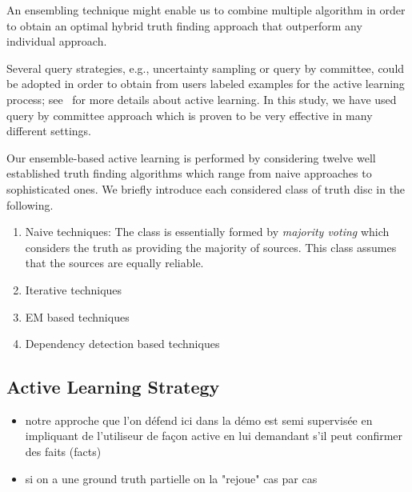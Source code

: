 An ensembling technique might enable  us to combine multiple algorithm in order to obtain an optimal hybrid truth 
finding approach that outperform any individual approach. 

Several query strategies, e.g., uncertainty sampling or query by committee, could be adopted in order to obtain from users labeled
examples for the active learning process; see~\cite{burr12} for more details about active learning. In this study, we have used query 
by committee approach which is proven to be very effective in many different settings.



Our ensemble-based active learning is performed by considering twelve well established truth finding algorithms which range from naive approaches
to sophisticated ones. We briefly introduce each considered class of truth disc in the following.

\begin{enumerate}
 \item Naive techniques: The class is essentially formed by \emph{majority voting} which considers the truth as providing the majority of 
sources. This class assumes that the sources are equally reliable.
 \item Iterative techniques
 \item EM based techniques
 \item Dependency detection based techniques
\end{enumerate}



\subsection{Active Learning Strategy}
\begin{itemize}
 \item notre approche que l'on défend ici dans la démo est  semi supervisée en impliquant de l'utiliseur de façon active
en lui demandant s'il peut confirmer des faits (facts)
\item si on a une ground truth partielle on la "rejoue" cas par cas
\end{itemize}

